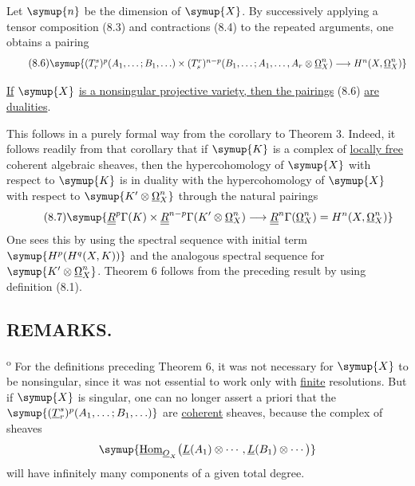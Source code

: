Let $\symup{n}$ be the dimension of $\symup{X}$. By successively applying a tensor composition
(8.3) and contractions (8.4) to the repeated arguments, one obtains a pairing
\begin{equation}\tag{8.6}
\resizebox{\textwidth}{!}{$\symup{
  (T_{r}^{s})^{p}(A_1,\ldots;B_1,\ldots)
  \times
  (T_{s}^{r})^{n-p}(B_1,\ldots;A_1,\ldots,A_r\otimes\underline{\Omega}_X^{n})
  \longrightarrow H^{n}(X,\underline{\Omega}_X^{n})
}$}
\end{equation}

 \uline{If} $\symup{X}$ \uline{is a nonsingular projective variety, then the
pairings} (8.6) \uline{are dualities}.

This follows in a purely formal way from the corollary to Theorem 3. Indeed, it
follows readily from that corollary that if $\symup{K}$ is a complex of \uline{locally free}
coherent algebraic sheaves, then the hypercohomology of $\symup{X}$ with respect to
$\symup{K}$ is in duality with the hypercohomology of $\symup{X}$ with respect to
$\symup{K'\otimes\underline{\Omega}_X^{n}}$ through the natural pairings
\begin{equation}\tag{8.7}
  \symup{\underline{\underline{R}}^{p}\Gamma(K)
  \times\underline{\underline{R}}^{n-p}\Gamma(K'\otimes\underline{\Omega}_X^{n})
  \longrightarrow\underline{\underline{R}}^{n}\Gamma(\underline{\Omega}_X^{n})
  =H^{n}(X,\underline{\Omega}_X^{n})}
\end{equation}
One sees this by using the spectral sequence with initial term
$\symup{H^{p}(H^{q}(X,K))}$ and the analogous spectral sequence for
$\symup{K'\otimes\underline{\Omega}_X^{n}}$. Theorem 6 follows from the preceding result by using
definition (8.1).

\subsection*{\normalfont REMARKS.}

\textsuperscript{o} For the definitions preceding Theorem 6, it was not necessary for
$\symup{X}$ to be nonsingular, since it was not essential to work only with \uline{finite}
resolutions. But if $\symup{X}$ is singular, one can no longer assert a priori that the
$\symup{(\underline{T}_{r}^{s})^{p}(A_1,\ldots;B_1,\ldots)}$ are \uline{coherent} sheaves,
because the complex of sheaves
\[
  \symup{\Homsh_{\Osh_X}\bigl(\underline{L}(A_1)\otimes\cdots,\underline{L}(B_1)\otimes\cdots\bigr)}
\]
will have infinitely many components of a given total degree.

